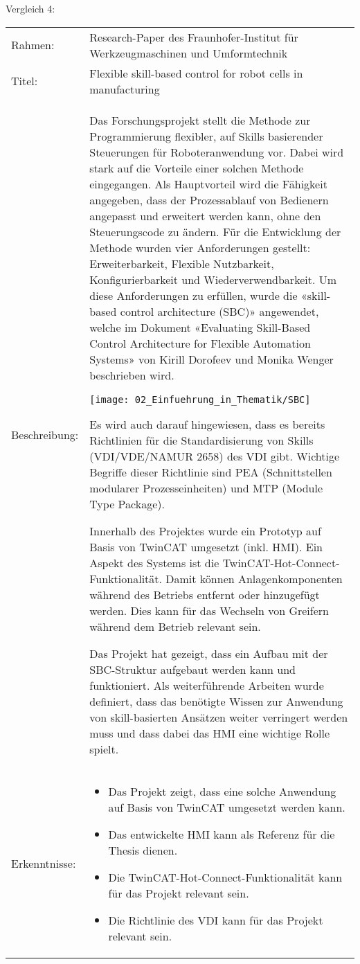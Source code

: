 		\newpage
	
	Vergleich 4:
	\vspace{2mm}
	\\
		\begin{tabularx}{\textwidth}{@{}>{}p{8em} X@{}}
		Rahmen: & 
		Research-Paper des Fraunhofer-Institut für Werkzeugmaschinen und Umformtechnik 
		\\
		
		Titel: & 
		Flexible skill-based control for robot cells in manufacturing \cite{Vergleich_4}
		\\
		
		Beschreibung: & 
		Das Forschungsprojekt stellt die Methode zur Programmierung flexibler, auf Skills basierender Steuerungen für Roboteranwendung vor. Dabei wird stark auf die Vorteile einer solchen Methode eingegangen. Als Hauptvorteil wird die Fähigkeit angegeben, dass der Prozessablauf von Bedienern angepasst und erweitert werden kann, ohne den Steuerungscode zu ändern. Für die Entwicklung der Methode wurden vier Anforderungen gestellt: Erweiterbarkeit, Flexible Nutzbarkeit, Konfigurierbarkeit und Wiederverwendbarkeit. Um diese Anforderungen zu erfüllen, wurde die «skill-based control architecture (SBC)» angewendet, welche im Dokument «Evaluating Skill-Based Control Architecture for Flexible Automation Systems» von Kirill Dorofeev und Monika Wenger beschrieben wird. 
		
		\texttt{[image: 02\_Einfuehrung\_in\_Thematik/SBC]}
		
		Es wird auch darauf hingewiesen, dass es bereits Richtlinien für die Standardisierung von Skills (VDI/VDE/NAMUR 2658) des \Gls{VDI} gibt. Wichtige Begriffe dieser Richtlinie sind PEA (Schnittstellen modularer Prozesseinheiten) und \Gls{MTP} (Module Type Package).
		
		Innerhalb des Projektes wurde ein Prototyp auf Basis von TwinCAT umgesetzt (inkl. \Gls{HMI}). Ein Aspekt des Systems ist die TwinCAT-Hot-Connect-Funktionalität. Damit können Anlagenkomponenten während des Betriebs entfernt oder hinzugefügt werden. Dies kann für das Wechseln von Greifern während dem Betrieb relevant sein. 
		
		Das Projekt hat gezeigt, dass ein Aufbau mit der SBC-Struktur aufgebaut werden kann und funktioniert. Als weiterführende Arbeiten wurde definiert, dass das benötigte Wissen zur Anwendung von skill-basierten Ansätzen weiter verringert werden muss und dass dabei das \Gls{HMI} eine wichtige Rolle spielt. 
		\\
		
		Erkenntnisse: & 
		\begin{itemize}
			\item Das Projekt zeigt, dass eine solche Anwendung auf Basis von TwinCAT umgesetzt werden kann.
			\item Das entwickelte \Gls{HMI} kann als Referenz für die Thesis dienen.
			\item Die TwinCAT-Hot-Connect-Funktionalität kann für das Projekt relevant sein.
			\item Die Richtlinie des VDI kann für das Projekt relevant sein.
		\end{itemize}
	\end{tabularx}
	
